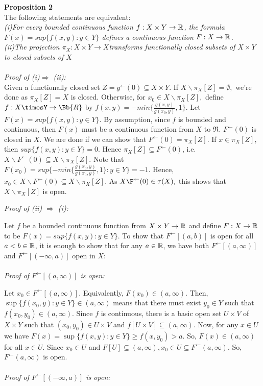 \documentclass{article}
\begin{document}
\textbf{Proposition 2}\\
The following statements are equivalent: \\
\emph{(i)For every bounded continuous function $f: X \times Y \rightarrow \Bbb{R}$, the formula $F(x)=sup\{f(x,y): y\in Y\}$ defines a continuous function $F: X \rightarrow \Bbb{R}$.\\
(ii)The projection $\pi_X: X\times Y \rightarrow X$transforms functionally closed subsets of $X\times Y$ to closed subsets of $X$}\\

\\
\emph{Proof of (i)$\Rightarrow$ (ii):}\\ 
Given a functionally closed set  $Z=g^{\leftarrow}(0) \subseteq X \times Y.$ If $X \backslash \pi_X[Z]=\emptyset,$ we're done as $\pi_X[Z]=X$ is closed. Otherwise, for $x_0 \in X \backslash \pi_X[Z],$ define $f:X\timesY \rightarrow \Bb{R}$ by $f(x,y)=-min\{\frac{g(x,y)}{g(x_0,y)}, 1\}.$ Let $F(x)=sup\{f(x,y): y\in Y\}$. By assumption, since  $f$ is bounded and continuous, then $F(x)$ must be a continuous function from $X$ to $\Re.$ $F^\leftarrow (0)$ is closed in $X$. We are done if we can show that  $F^\leftarrow (0)= \pi_X[Z]$.
If $x\in \pi_X[Z]$, then $sup\{f(x,y): y\in Y\}=0$. Hence $\pi_X[Z] \subseteq F^\leftarrow (0)$, i.e. $X\backslash F^{\leftarrow}(0) \subseteq X\backslash \pi_X[Z]$.
Note that $F(x_0)=sup\{-min\{\frac{g(x_0,y)}{g(x_0,y)}, 1\}: y\in Y\}=-1$. Hence, $x_0 \in X\backslash F^\leftarrow(0)\subseteq X\backslash \pi_X[Z].$ As $X\F^\leftarrow(0)\in \tau(X),$ this shows that $X\backslash \pi_X[Z]$ is open.

\emph{Proof of (ii) $\Rightarrow$ (i):}


Let $f$ be a bounded continuous function from $X\times Y \rightarrow \Bbb{R}$ and define $F: X \rightarrow \Bbb{R}$ to be $F(x)=sup\{f(x,y):y\in Y\}.$ 
To show that $F^\leftarrow [(a,b)]$ is open for all $a<b \in \Bbb{R}$, it is enough to show that for any $a\in \Bbb{R}$, we have both $F^\leftarrow [(a,\infty)]$ and $F^\leftarrow [(-\infty,a)]$ open in $X$:\\
\\
\emph{Proof of $F^\leftarrow [(a,\infty)]$ is open:}


Let $x_0 \in F^\leftarrow [(a,\infty)]$. Equivalently,  $F(x_0) \in (a, \infty).$ Then, $\sup\{f(x_0,y):y\in Y\} \in (a, \infty)$ means that there must exist $y_0\in Y$ such that $f(x_0, y_0) \in (a, \infty).$ Since $f$ is continuous, there is a basic open set $U \times V$ of $X \times Y$ such that $(x_0,y_0) \in U\times V$ and $f[U\times V] \subseteq (a, \infty).$ Now, for any $x\in U$ we have $F(x)=\sup\{f(x,y):y\in Y\}\geq f(x,y_0) > a.$ So, $F(x)\in (a, \infty)$ for all $x\in U$. Since $x_0\in U$ and $F[U] \subseteq (a, \infty), x_0\in U \subseteq F^\leftarrow(a, \infty).$ So, $F^\leftarrow(a, \infty)$ is open.\\
\\
\emph{Proof of $F^\leftarrow [(-\infty,a)]$ is open: }
\end{document}
